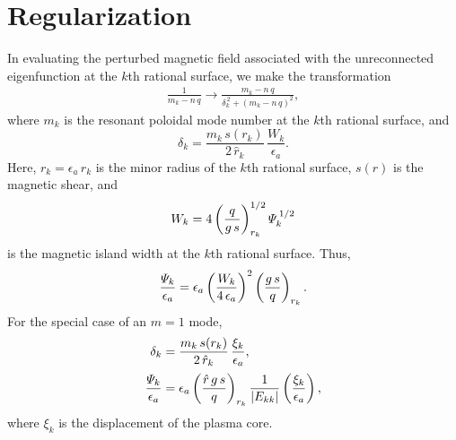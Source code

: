 \documentclass[12pt,prb,aps,notitlepage]{revtex4-1}
\begin{document}
\section{Regularization}
In evaluating the perturbed magnetic field associated with the unreconnected eigenfunction at the $k$th rational surface, we make the
transformation
\begin{align}
\frac{1}{m_k-n\,q} \rightarrow \frac{m_k-n\,q}{\delta_k^{\,2} + (m_k-n\,q)^2},
\end{align}
where $m_k$ is the resonant poloidal mode number at the $k$th rational surface, and
\begin{equation}
\delta_k = \frac{m_k\,s(r_k)}{2\,\hat{r}_k}\,\frac{W_k}{\epsilon_a}.
\end{equation}
Here, $r_k=\epsilon_a\,\hat{r}_k$ is the minor radius of the $k$th rational surface, $s(r)$ is the magnetic shear, and 
\begin{equation}
W_k = 4\left(\frac{q}{g\,s}\right)_{r_k}^{1/2}{\mit\Psi}_k^{\,1/2}
\end{equation}
is the magnetic island width at the $k$th rational surface. 
Thus, 
\begin{equation}
\frac{{\mit\Psi}_k}{\epsilon_a}= \epsilon_a \left(\frac{W_k}{4\,\epsilon_a}\right)^2\left(\frac{g\,s}{q}\right)_{r_k}.
\end{equation}
For the special case of an $m=1$ mode,
\begin{align}
\delta_k &= \frac{m_k\,s(r_k)}{2\,\hat{r}_k}\,\frac{\xi_k}{\epsilon_a},\\[0.5ex]
\frac{{\mit\Psi}_k}{\epsilon_a} &= \epsilon_a\left(\frac{\hat{r}\,g\,s}{q}\right)_{r_k}\frac{1}{|E_{kk}|} \left(\frac{\xi_k}{\epsilon_a}\right),
\end{align}
where $\xi_k$ is the displacement of the plasma core. 
\end{document}

